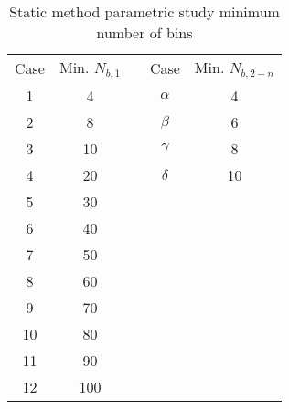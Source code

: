 \documentclass[review,12pt]{elsarticle}
\begin{document}
\begin{table}[htbp!]
\centering
\caption{Static method parametric study minimum number of bins}
\label{tab:static case nums}
\begin{tabular}{|c|c|ccc}
\cline{1-2} \cline{4-5}
Case & Min. $N_{b,1}$ & \multicolumn{1}{c|}{} & \multicolumn{1}{c|}{Case}                  & \multicolumn{1}{c|}{Min. $N_{b,2-n}$} \\ \cline{1-2} \cline{4-5}
1    & 4                     & \multicolumn{1}{c|}{} & \multicolumn{1}{c|}{$\alpha$} & \multicolumn{1}{c|}{4}                    \\ \cline{1-2} \cline{4-5}
2    & 8                     & \multicolumn{1}{c|}{} & \multicolumn{1}{c|}{$\beta$}  & \multicolumn{1}{c|}{6}                    \\ \cline{1-2} \cline{4-5}
3    & 10                    & \multicolumn{1}{c|}{} & \multicolumn{1}{c|}{$\gamma$} & \multicolumn{1}{c|}{8}                    \\ \cline{1-2} \cline{4-5}
4    & 20                    & \multicolumn{1}{c|}{} & \multicolumn{1}{c|}{$\delta$} & \multicolumn{1}{c|}{10}                   \\ \cline{1-2} \cline{4-5}
5    & 30                    &                       &                                            &                                           \\ \cline{1-2}
6    & 40                    &                       &                                            &                                           \\ \cline{1-2}
7    & 50                    &                       &                                            &                                           \\ \cline{1-2}
8    & 60                    &                       &                                            &                                           \\ \cline{1-2}
9    & 70                    &                       &                                            &                                           \\ \cline{1-2}
10   & 80                    &                       &                                            &                                           \\ \cline{1-2}
11   & 90                    &                       &                                            &                                           \\ \cline{1-2}
12   & 100                   &                       &                                            &                                           \\ \cline{1-2}
\end{tabular}
\end{table}
\end{document}
